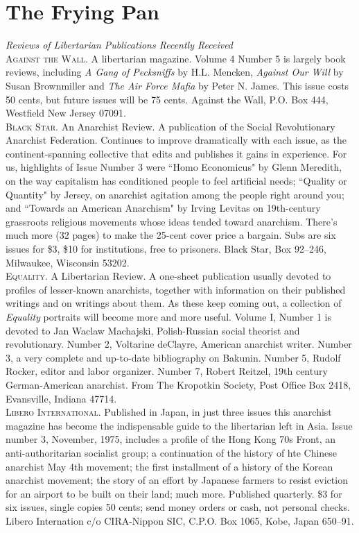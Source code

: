 \chapter{The Frying Pan}
\vspace{-1cm}
\emph{Reviews of Libertarian Publications Recently Received}\\

\noindent\textsc{Against the Wall.} A libertarian magazine. Volume 4 Number 5 is largely book reviews, including \emph{A Gang of Pecksniffs} by H.L. Mencken, \emph{Against Our Will} by Susan Brownmiller and \emph{The Air Force Mafia} by Peter N. James. This issue costs 50 cents, but future issues will be 75 cents. Against the Wall, P.O. Box 444, Westfield New Jersey 07091.\\

\noindent\textsc{Black Star.} An Anarchist Review. A publication of the Social Revolutionary Anarchist Federation. Continues to improve dramatically with each issue, as the continent-spanning collective that edits and publishes it gains in experience. For us, highlights of Issue Number 3 were ``Homo Economicus" by Glenn Meredith, on the way capitalism has conditioned people to feel artificial needs; ``Quality or Quantity" by Jersey, on anarchist agitation among the people right around you; and ``Towards an American Anarchism" by Irving Levitas on 19th-century grassroots religious movements whose ideas tended toward anarchism. There's much more (32 pages) to make the 25-cent cover price a bargain. Subs are six issues for \$3, \$10 for institutions, free to prisoners. Black Star, Box 92--246, Milwaukee, Wisconsin 53202.\\

\noindent\textsc{Equality.} A Libertarian Review. A one-sheet publication usually devoted to profiles of lesser-known anarchists, together with information on their published writings and on writings about them. As these keep coming out, a collection of \emph{Equality} portraits will become more and more useful. Volume I, Number 1 is devoted to Jan Waclaw Machajski, Polish-Russian social theorist and revolutionary. Number 2, Voltarine deClayre, American anarchist writer. Number 3, a very complete and up-to-date bibliography on Bakunin. Number 5, Rudolf Rocker, editor and labor organizer. Number 7, Robert Reitzel, 19th century German-American anarchist. From The Kropotkin Society, Post Office Box 2418, Evansville, Indiana 47714.\\

\noindent\textsc{Libero International.} Published in Japan, in just three issues this anarchist magazine has become the indispensable guide to the libertarian left in Asia. Issue number 3, November, 1975, includes a profile of the Hong Kong 70s Front, an anti-authoritarian socialist group; a continuation of the history of hte Chinese anarchist May 4th movement; the first installment of a history of the Korean anarchist movement; the story of an effort by Japanese farmers to resist eviction for an airport to be built on their land; much more. Published quarterly. \$3 for six issues, single copies 50 cents; send money orders or cash, not personal checks. Libero Internation c/o CIRA-Nippon SIC, C.P.O. Box 1065, Kobe, Japan 650--91.\\

